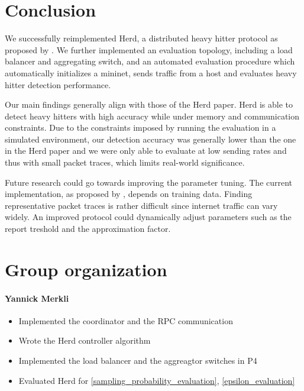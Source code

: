 \documentclass[11pt,oneside,a4paper]{article}
\begin{document}
\section{Conclusion}


We successfully reimplemented Herd, a distributed heavy hitter protocol as proposed by \cite{anon2019herd}. We further implemented an evaluation topology, including a load balancer and aggregating switch, and an automated evaluation procedure which automatically initializes a mininet, sends traffic from a host and evaluates heavy hitter detection performance.

\noindent Our main findings generally align with those of the Herd paper. Herd is able to detect heavy hitters with high accuracy while under memory and communication constraints. Due to the constraints imposed by running the evaluation in a simulated environment, our detection accuracy was generally lower than the one in the Herd paper and we were only able to evaluate at low sending rates and thus with small packet traces, which limits  real-world significance.

Future research could go towards improving the parameter tuning. The current implementation, as proposed by \cite{anon2019herd}, depends on training data. Finding representative packet traces is rather difficult since internet traffic can vary widely. An improved protocol could dynamically adjust parameters such as the report treshold and the approximation factor.


\label{lastpage} %
\clearpage
{}



\clearpage
\appendix
{}

\section{Group organization}

\paragraph{Yannick Merkli}
\begin{itemize}
	\item Implemented the coordinator and the RPC communication
	\item Wrote the Herd controller algorithm
	\item Implemented the load balancer and the aggreagtor switches in P4
	\item Evaluated Herd for \ref{sampling_probability_evaluation}, \ref{epsilon_evaluation}
\end{itemize}
\end{document}
